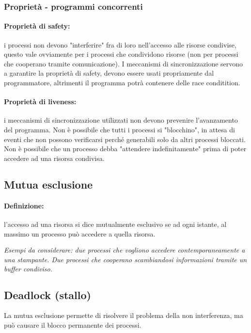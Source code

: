 \subsubsection{Proprietà - programmi concorrenti}
\paragraph{Proprietà di safety:} i processi non devono "interferire" fra di loro nell'accesso alle risorse
condivise, questo vale ovviamente per i processi che condividono risorse (non per processi che cooperano tramite comunicazione).
I meccanismi di sincronizzazione servono a garantire la
proprietà di safety, devono essere usati propriamente dal programmatore, altrimenti il programma potrà contenere delle race conditition.

\paragraph{Proprietà di liveness:} i meccanismi di sincronizzazione utilizzati non devono prevenire l'avanzamento del programma. Non è possibile che tutti i processi si "blocchino", in attesa di eventi che non possono verificarsi perché generabili solo da altri processi bloccati.
Non è possibile che un processo debba "attendere indefinitamente"
prima di poter accedere ad una risorsa condivisa.

\subsection{Mutua esclusione}
\paragraph{Definizione:} l'accesso ad una risorsa si dice mutualmente esclusivo se ad ogni istante, al massimo un processo può accedere a quella risorsa.

\textit{Esempi da considerare: due processi che vogliono accedere contemporaneamente a una stampante. Due processi che cooperano scambiandosi informazioni tramite un buffer condiviso.}

\subsection{Deadlock (stallo)}
La mutua esclusione permette di risolvere il problema della non
interferenza, ma può causare il blocco permanente dei processi.
\newline

